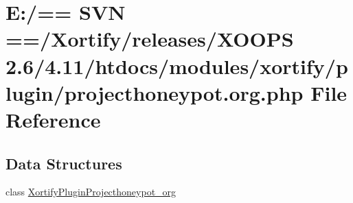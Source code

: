 \hypertarget{projecthoneypot_8org_8php}{\section{E\-:/== S\-V\-N ==/\-Xortify/releases/\-X\-O\-O\-P\-S 2.6/4.11/htdocs/modules/xortify/plugin/projecthoneypot.org.\-php File Reference}
\label{projecthoneypot_8org_8php}
}
\subsection*{Data Structures}
\begin{DoxyCompactItemize}
\item 
class \hyperlink{class_xortify_plugin_projecthoneypot__org}{Xortify\-Plugin\-Projecthoneypot\-\_\-org}
\end{DoxyCompactItemize}

